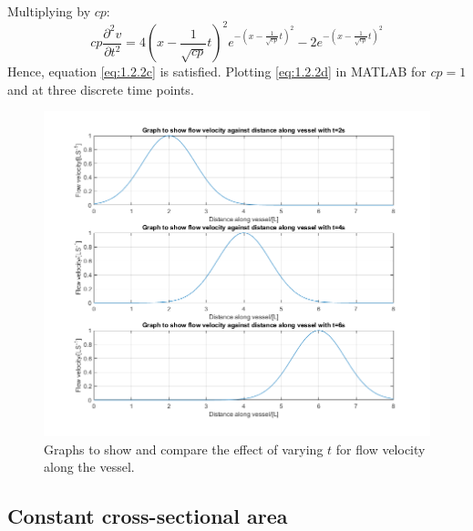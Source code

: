 \documentclass[11pt]{article}
\numberwithin{equation}{section}
\begin{document}
Multiplying by $cp$:
\begin{equation}
    cp\frac{\partial^2v}{\partial t^2} = 4\left(x - \frac{1}{\sqrt{cp}}t\right)^2 e^{-\left(x- \frac{1}{\sqrt{cp}}t\right)^2} -2e^{-\left(x- \frac{1}{\sqrt{cp}}t\right)^2}
\end{equation}
Hence, equation \ref{eq:1.2.2c} is satisfied. Plotting \ref{eq:1.2.2d} in MATLAB  for $cp = 1$ and at three discrete time points. 

\begin{figure}[H]
    \centering
    \includegraphics[width = \textwidth]{./img/q102b.png}
    \caption{Graphs to show and compare the effect of varying $t$ for flow velocity along the vessel.}
    \label{fig:q102a}
\end{figure}
\subsection{Constant cross-sectional area}
\end{document}
